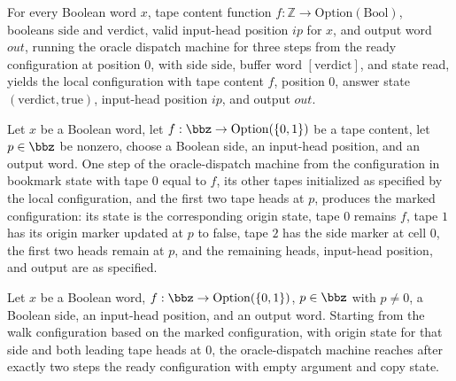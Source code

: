 \begin{theorem}
\label{Turing.oracleRestore_zero}
\leanok
{}
For every Boolean word $x$, tape content function
$f\colon\mathbb{Z}\to\mathrm{Option}(\mathrm{Bool})$, booleans $\mathrm{side}$ and
$\mathrm{verdict}$, valid input-head position $ip$ for $x$, and output word $out$,
running the oracle dispatch machine for three steps from the ready configuration at
position $0$, with side $\mathrm{side}$, buffer word $[\mathrm{verdict}]$, and state
read, yields the local configuration with tape content $f$, position $0$, answer state
$(\mathrm{verdict},\mathrm{true})$, input-head position $ip$, and output $out$.
\end{theorem}

\begin{theorem}
\label{Turing.oracleMark_step}
\leanok
{}
Let $x$ be a Boolean word, let $f:\bbz\to\mathrm{Option}(\{0,1\})$ be a tape content,
let $p\in\bbz$ be nonzero, choose a Boolean side, an input-head position, and an output
word. One step of the oracle-dispatch machine from the configuration in bookmark state
with tape $0$ equal to $f$, its other tapes initialized as specified by the local
configuration, and the first two tape heads at $p$, produces the marked configuration:
its state is the corresponding origin state, tape $0$ remains $f$, tape $1$ has its
origin marker updated at $p$ to false, tape $2$ has the side marker at cell $0$, the
first two heads remain at $p$, and the remaining heads, input-head position, and output
are as specified.
\end{theorem}

\begin{theorem}
\label{Turing.oraclePrepare_tail}
\leanok
{}
Let $x$ be a Boolean word, $f:\bbz\to\mathrm{Option}(\{0,1\})$, $p\in\bbz$ with $p\ne0$,
a Boolean side, an input-head position, and an output word. Starting from the walk
configuration based on the marked configuration, with origin state for that side and
both leading tape heads at $0$, the oracle-dispatch machine reaches after exactly two
steps the ready configuration with empty argument and copy state.
\end{theorem}

